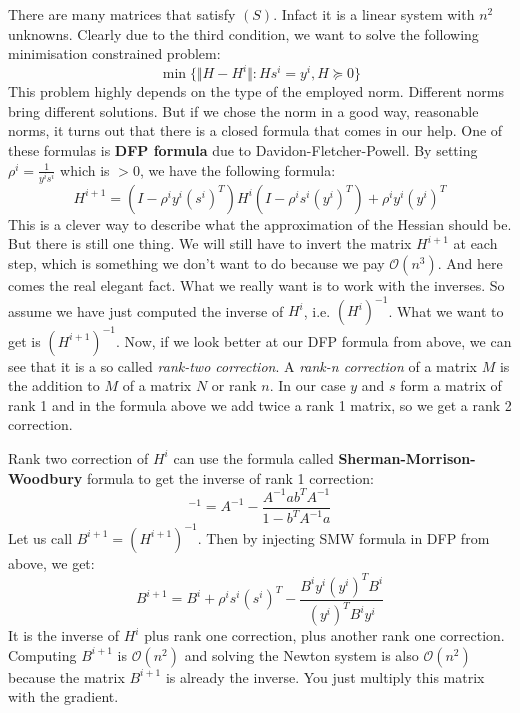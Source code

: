 \par There are many matrices that satisfy $(S)$. Infact it is a linear system with $n^2$ unknowns. Clearly due to the third condition, we want to solve the following minimisation constrained problem:
\begin{equation}
    \min \{\Vert H - H^i \Vert : H s^i = y^i, H \succeq 0\}
\end{equation}
This problem highly depends on the type of the employed norm. Different norms bring different solutions. But if we chose the norm in a good way, reasonable norms, it turns out that there is a closed formula that comes in our help. One of these formulas is \textbf{DFP formula} due to Davidon-Fletcher-Powell. By setting $\rho^i = \frac{1}{y^i s^i}$ which is $> 0$, we have the following formula:
\begin{equation}
    H^{i+1} = (I - \rho^i y^i (s^i)^T) H^i (I - \rho^i s^i (y^i)^T) + \rho^i y^i (y^i)^T
\end{equation}
This is a clever way to describe what the approximation of the Hessian should be. But there is still one thing. We will still have to invert the matrix $H^{i+1}$ at each step, which is something we don't want to do because we pay $\mathcal{O}(n^3)$. And here comes the real elegant fact. What we really want is to work with the inverses. So assume we have just computed the inverse of $H^i$, i.e. $(H^i)^{-1}$. What we want to get is $(H^{i+1})^{-1}$. Now, if we look better at our DFP formula from above, we can see that it is a so called \textit{rank-two correction}. A \textit{rank-n correction} of a matrix $M$ is the addition to $M$ of a matrix $N$ or rank $n$. In our case $y$ and $s$ form a matrix of rank 1 and in the formula above we add twice a rank 1 matrix, so we get a rank 2 correction.
\par Rank two correction of $H^i$ can use the formula called \textbf{Sherman-Morrison-Woodbury} formula to get the inverse of rank 1 correction:
\begin{equation}
    [A + a b^T]^{-1} = A^{-1} - \frac{A^{-1} a b^T A^{-1}}{1 - b^T A^{-1} a}
\end{equation}
Let us call $B^{i+1} = (H^{i+1})^{-1}$. Then by injecting SMW formula in DFP from above, we get:
\begin{equation}
    B^{i+1} = B^i + \rho^i s^i (s^i)^T - \frac{B^i y^i (y^i)^T B^i}{(y^i)^T B^i y^i}
\end{equation}
It is the inverse of $H^i$ plus rank one correction, plus another rank one correction. Computing $B^{i+1}$ is $\mathcal{O}(n^2)$ and solving the Newton system is also $\mathcal{O}(n^2)$ because the matrix $B^{i+1}$ is already the inverse. You just multiply this matrix with the gradient.
